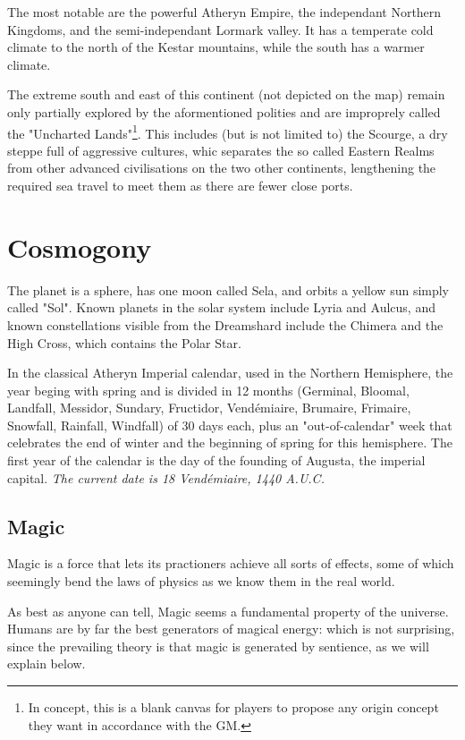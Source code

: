 The most notable are the powerful Atheryn Empire, the independant Northern Kingdoms, and the semi-independant Lormark valley. It has a temperate cold climate to the north of the Kestar mountains, while the south has a warmer climate.

The extreme south and east of this continent (not depicted on the map) remain only partially explored by the aformentioned polities and are improprely called the "Uncharted Lands"\footnote{In concept, this is a blank canvas for players to propose any origin concept they want in accordance with the GM.}. This includes (but is not limited to) the Scourge, a dry steppe full of aggressive cultures, whic separates the so called Eastern Realms from other advanced civilisations on the two other continents, lengthening the required sea travel to meet them as there are fewer close ports.

\section{Cosmogony}

The planet is a sphere, has one moon called Sela, and orbits a yellow sun simply called "Sol". Known planets in the solar system include Lyria and Aulcus, and known constellations visible from the Dreamshard include the Chimera and the High Cross, which contains the Polar Star.

In the classical Atheryn Imperial calendar, used in the Northern Hemisphere, the year beging with spring and is divided in 12 months (Germinal, Bloomal, Landfall, Messidor, Sundary, Fructidor, Vendémiaire, Brumaire, Frimaire, Snowfall, Rainfall, Windfall) of 30 days each, plus an "out-of-calendar" week that celebrates the end of winter and the beginning of spring for this hemisphere. The first year of the calendar is the day of the founding of Augusta, the imperial capital. \textit{The current date is 18 Vendémiaire, 1440 A.U.C.}


\subsection{Magic}

\label{magic_lore}

Magic is a force that lets its practioners achieve all sorts of effects, some of which seemingly bend the laws of physics as we know them in the real world.

As best as anyone can tell, Magic seems a fundamental property of the universe. Humans are by far the best generators of magical energy: which is not surprising, since the prevailing theory is that magic is generated by sentience, as we will explain below.


